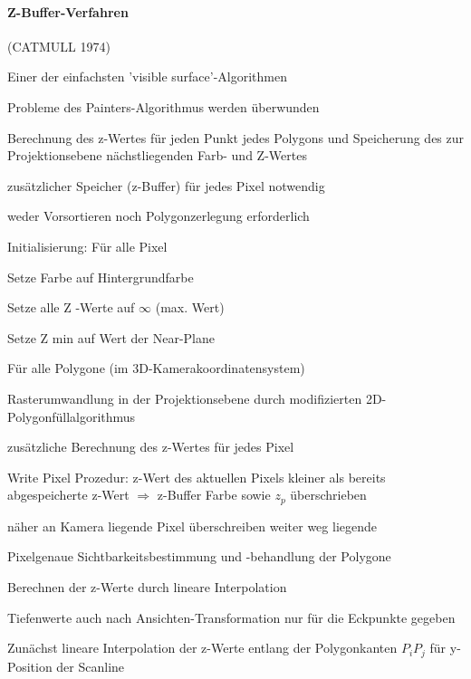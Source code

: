 \documentclass[landscape]{article}
\begin{document}
\begin{multicols}{3}
  \paragraph{Z-Buffer-Verfahren} (CATMULL 1974)
  \begin{itemize*}
    \item Einer der einfachsten 'visible surface'-Algorithmen 
    \item Probleme des Painters-Algorithmus werden überwunden
    \item Berechnung des z-Wertes für jeden Punkt jedes Polygons und Speicherung des zur Projektionsebene nächstliegenden Farb- und Z-Wertes
    \item zusätzlicher Speicher (z-Buffer) für jedes Pixel notwendig
    \item weder Vorsortieren noch Polygonzerlegung erforderlich
    \item Initialisierung: Für alle Pixel
    \begin{itemize*}
      \item Setze Farbe auf Hintergrundfarbe
      \item Setze alle Z -Werte auf $\infty$ (max. Wert)
      \item Setze Z min auf Wert der Near-Plane
    \end{itemize*}
    \item Für alle Polygone (im 3D-Kamerakoordinatensystem)
    \begin{itemize*}
      \item Rasterumwandlung in der Projektionsebene durch modifizierten 2D-Polygonfüllalgorithmus
      \item zusätzliche Berechnung des z-Wertes für jedes Pixel
      \item Write Pixel Prozedur: z-Wert des aktuellen Pixels kleiner als bereits abgespeicherte z-Wert $\Rightarrow$ z-Buffer Farbe sowie $z_p$ überschrieben
      \item näher an Kamera liegende Pixel überschreiben weiter weg liegende
      \item Pixelgenaue Sichtbarkeitsbestimmung und -behandlung der Polygone
    \end{itemize*}
    \item Berechnen der z-Werte durch lineare Interpolation
    \begin{itemize*}
      \item Tiefenwerte auch nach Ansichten-Transformation nur für die Eckpunkte gegeben
      \item Zunächst lineare Interpolation der z-Werte entlang der Polygonkanten $P_i P_j$ für y-Position der Scanline

\end{itemize*}
\end{itemize*}
\end{multicols}
\end{document}
